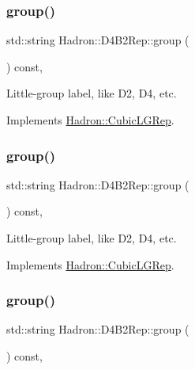 \subsubsection{\texorpdfstring{group()}{group()}\hspace{0.1cm}{\footnotesize\ttfamily [3/5]}}
{\footnotesize\ttfamily std\+::string Hadron\+::\+D4\+B2\+Rep\+::group (\begin{DoxyParamCaption}{ }\end{DoxyParamCaption}) const\hspace{0.3cm}{\ttfamily [inline]}, {\ttfamily [virtual]}}

Little-\/group label, like D2, D4, etc. 

Implements \mbox{\hyperlink{structHadron_1_1CubicLGRep_a9bdb14b519a611d21379ed96a3a9eb41}{Hadron\+::\+Cubic\+L\+G\+Rep}}.

\mbox{\label{structHadron_1_1D4B2Rep_a1d6852d7785e4c17d4ca5ce9c63edda4}} 
\subsubsection{\texorpdfstring{group()}{group()}\hspace{0.1cm}{\footnotesize\ttfamily [4/5]}}
{\footnotesize\ttfamily std\+::string Hadron\+::\+D4\+B2\+Rep\+::group (\begin{DoxyParamCaption}{ }\end{DoxyParamCaption}) const\hspace{0.3cm}{\ttfamily [inline]}, {\ttfamily [virtual]}}

Little-\/group label, like D2, D4, etc. 

Implements \mbox{\hyperlink{structHadron_1_1CubicLGRep_a9bdb14b519a611d21379ed96a3a9eb41}{Hadron\+::\+Cubic\+L\+G\+Rep}}.

\mbox{\label{structHadron_1_1D4B2Rep_a1d6852d7785e4c17d4ca5ce9c63edda4}} 
\subsubsection{\texorpdfstring{group()}{group()}\hspace{0.1cm}{\footnotesize\ttfamily [5/5]}}
{\footnotesize\ttfamily std\+::string Hadron\+::\+D4\+B2\+Rep\+::group (\begin{DoxyParamCaption}{ }\end{DoxyParamCaption}) const\hspace{0.3cm}{\ttfamily [inline]}, {\ttfamily [virtual]}}


